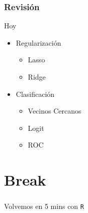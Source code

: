 \documentclass[
  shownotes,
  xcolor={svgnames},
  hyperref={colorlinks,citecolor=DarkBlue,linkcolor=DarkRed,urlcolor=DarkBlue}
  , aspectratio=169]{beamer}
\begin{document}
\begin{frame}
\frametitle{Revisión }
  
Hoy
    \medskip
    \begin{itemize} 
        \item Regularización
         \medskip
         \begin{itemize}  
           \item Lasso 
           \medskip
           \item Ridge
        \end{itemize}   
         \item Clasificación
         \medskip
        \begin{itemize}  
           \item Vecinos Cercanos
           \medskip
           \item Logit
           \medskip
           \item ROC
        \end{itemize}
    \end{itemize}
  





\end{frame}

\section{Break}
\begin{frame}
\frametitle{}

\begin{centering}
\huge
\textcolor{andesred}{Volvemos en 5 mins con \texttt{R} }

\end{centering}

\end{frame}
\end{document}
